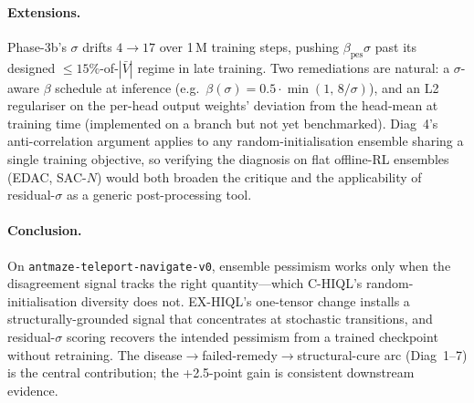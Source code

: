 \documentclass[11pt]{article}
\begin{document}
\paragraph{Extensions.}
Phase-3b's $\sigma$ drifts $4 \to 17$ over 1\,M training steps,
pushing $\beta_\text{pes}\sigma$ past its designed $\le\!15\%$-of-$|\bar V|$
regime in late training.
Two remediations are natural: a $\sigma$-aware $\beta$ schedule at
inference (e.g.\ $\beta(\sigma) = 0.5 \cdot \min(1,\,8/\sigma)$), and
an L2 regulariser on the per-head output weights' deviation from the
head-mean at training time (implemented on a branch but not yet
benchmarked).
Diag~4's anti-correlation argument applies to any random-initialisation
ensemble sharing a single training objective, so verifying the diagnosis
on flat offline-RL ensembles (EDAC, SAC-$N$) would both broaden the
critique and the applicability of residual-$\sigma$ as a generic
post-processing tool.

\paragraph{Conclusion.}
On \texttt{antmaze-teleport-navigate-v0}, ensemble pessimism works only
when the disagreement signal tracks the right quantity---which C-HIQL's
random-initialisation diversity does not.
EX-HIQL's one-tensor change installs a structurally-grounded signal
that concentrates at stochastic transitions, and residual-$\sigma$
scoring recovers the intended pessimism from a trained checkpoint
without retraining.
The disease$\to$failed-remedy$\to$structural-cure arc (Diag~1--7) is
the central contribution; the +2.5-point gain is consistent downstream
evidence.
\end{document}
